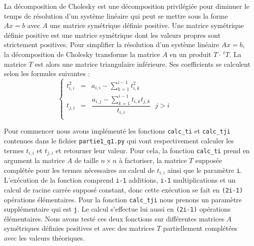 \documentclass{article}
\begin{document}
La décomposition de Cholesky est une décomposition privilégiée pour diminuer le temps de résolution d'un système linéaire qui peut se mettre sous la forme $Ax=b$ avec $A$ une matrice symétrique définie positive. Une matrice symétrique définie positive est une matrice symétrique dont les valeurs propres sont strictement positives. Pour simplifier la résolution d'un système linéaire $Ax=b$, la décomposition de Cholesky transforme la matrice $A$ en un produit $T\cdot~^tT$. La matrice $T$ est alors une matrice triangulaire inférieure. Ses coefficients se calculent selon les formules suivantes :\\
\[ \left\{
\begin{array}{rcr}
  t_{i,i}^{2} & = & a_{i,i} - \sum\limits^{i-1}_{k=1}t_{i,k}^{2} \mbox{ } \mbox{ } \mbox{ } \mbox{ }\mbox{ } \mbox{ } \mbox{ } \mbox{ } \mbox{ } \mbox{ } \mbox{ } \mbox{ } \\
  t_{j,i} & = & \dfrac{a_{i,j} - \sum\limits^{i-1}_{k=1}t_{i,k}t_{j,k}}{t_{i,i}} \mbox{ } j > i \\
\end{array}
\right.\]

Pour commencer nous avons implémenté les fonctions \texttt{calc\_ti} et \texttt{calc\_tji} contenues dans le fichier \texttt{partie1\_q1.py} qui vont respectivement calculer les termes \texttt{$t_{i,i}$} et \texttt{$t_{j,i}$} et retourner leur valeur. Pour cela, la fonction \texttt{calc\_ti} prend en argument la matrice $A$ de taille $n \times n$ à factoriser, la matrice $T$ supposée complétée pour les termes nécessaires au calcul de $t_{i,i}$ ainsi que le paramètre \texttt{i}. L'exécution de la fonction comprend \texttt{i-1} additions, \texttt{i-1} multiplications et un calcul de racine carrée supposé constant, donc cette exécution se fait en \texttt{(2i-1)} opérations élémentaires. Pour la fonction \texttt{calc\_tji} nous prenons un paramètre supplémentaire qui est \texttt{j}. Le calcul s'effectue lui aussi en \texttt{(2i-1)} opérations élémentaires. Nous avons testé ces deux fonctions sur différentes matrices $A$ symétriques définies positives et avec des matrices $T$ partiellement complétées avec les valeurs théoriques.
\end{document}
